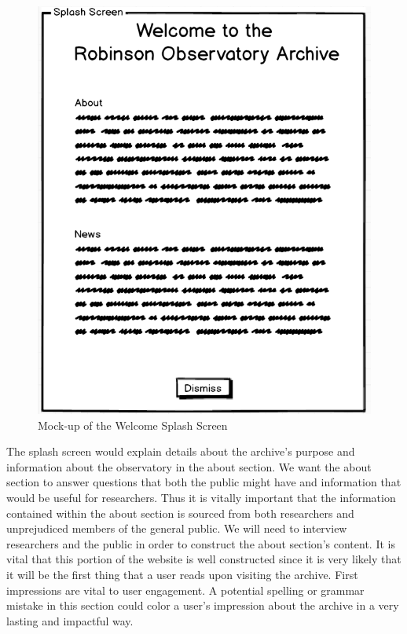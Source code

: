\documentclass[12pt]{report}
\begin{document}
\begin{figure}[h]
	\centering
	\includegraphics[scale=0.5]{splash_screen_mockup}
	\caption{Mock-up of the Welcome Splash Screen}
	\label{fig:splashscreenmockup}
\end{figure}

The splash screen would explain details about the archive's purpose and information about the observatory in the about section. We want the about section to answer questions that both the public might have and information that would be useful for researchers. Thus it is vitally important that the information contained within the about section is sourced from both researchers and unprejudiced members of the general public. We will need to interview researchers and the public in order to construct the about section's content. It is vital that this portion of the website is well constructed since it is very likely that it will be the first thing that a user reads upon visiting the archive. First impressions are vital to user engagement. A potential spelling or grammar mistake in this section could color a user's impression about the archive in a very lasting and impactful way.
\end{document}
